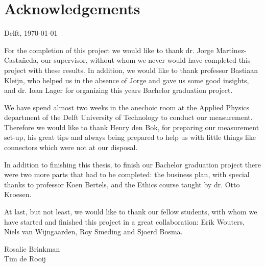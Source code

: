 \chapter*{Acknowledgements}
\begin{flushright}
Delft, \today
\end{flushright}
For the completion of this project we would like to thank dr. Jorge Mart\`inez-Casta\~neda, our supervisor, without whom we never would have completed this project with these results.
In addition, we would like to thank professor Bastiaan Kleijn, who helped us in the absence of Jorge and gave us some good insights, and dr. Ioan Lager for organizing this years Bachelor graduation project.

We have spend almost two weeks in the anechoic room at the Applied Physics department of the Delft University of Technology to conduct our measurement.
Therefore we would like to thank Henry den Bok, for preparing our measurement set-up, his great tips and always being prepared to help us with little things like connectors which were not at our disposal.

In addition to finishing this thesis, to finish our Bachelor graduation project there were two more parts that had to be completed: the business plan, with special thanks to professor Koen Bertels, and the Ethics course taught by dr. Otto Kroesen.

At last, but not least, we would like to thank our fellow students, with whom we have started and finished this project in a great collaboration: Erik Wouters, Niels van Wijngaarden, Roy Smeding and Sjoerd Bosma.

\begin{flushright}
Rosalie Brinkman \\
Tim de Rooij \\
\end{flushright}